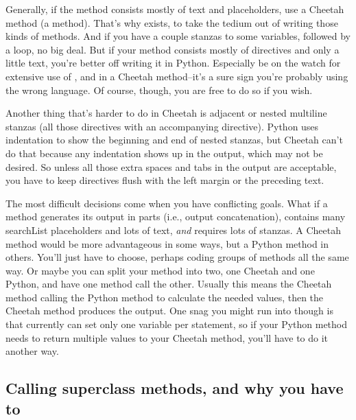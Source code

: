 Generally, if the method consists mostly of text and placeholders, use a 
Cheetah method (a  method).  That's why  exists, to
take the tedium out of writing those kinds of methods.  And if you have a
couple  stanzas to  some variables, followed by a
 loop, no big deal.  But if your method consists mostly of
directives and only a little text, you're better off writing it in Python.
Especially be on the watch for extensive use of ,  and
 in a Cheetah method--it's a sure sign you're probably using the
wrong language.  Of course, though, you are free to do so if you wish.  

Another thing that's harder to do in Cheetah is adjacent or nested
multiline stanzas (all those directives with an accompanying 
directive).  Python uses indentation to show the beginning and end of nested
stanzas, but Cheetah can't do that because any indentation shows up in the
output, which may not be desired.  So unless all those extra spaces and tabs
in the output are acceptable, you have to keep directives flush with the left
margin or the preceding text.  

The most difficult decisions come when you have conflicting goals.  What if
a method generates its output in parts (i.e., output concatenation), contains
many searchList placeholders and lots of text, {\em and} requires lots of
 stanzas.  A Cheetah
method would be more advantageous in some ways, but a Python method in others.
You'll just have to choose, perhaps coding groups of methods all the same
way.  Or maybe you can split your method into two, one Cheetah and one Python,
and have one method call the other.  Usually this means the Cheetah method
calling the Python method to calculate the needed values, then the Cheetah
method produces the output.  One snag you might run into though is that
 currently can set only one variable per statement, so if your
Python method needs to return multiple values to your Cheetah method, you'll
have to do it another way.



\subsection{Calling superclass methods, and why you have to}
\label{tips.callingSuperclassMethods}

